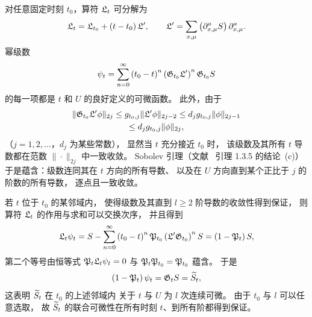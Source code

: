 对任意固定时刻 $t_0$，算符 $\mathfrak{L}_t$ 可分解为
\begin{equation}
  \mathfrak{L}_t=\mathfrak{L}_{t_0}+\left(t-t_0\right)\mathfrak{L}',
  \qquad
  \mathfrak{L}'=\sum_{x,\mu}
  \left(\partial^a_{x,\mu}S\right)\partial^a_{x,\mu}.
\end{equation}
幂级数
\begin{equation}
  \psi_t=\sum_{n=0}^{\infty}\left(t_0-t\right)^n
  \left(\mathfrak{G}_{t_0}\mathfrak{L}'\right)^n\mathfrak{G}_{t_0} S
\end{equation}
的每一项都是 $t$ 和 $U$ 的良好定义的可微函数。
此外，由于
\begin{multline}
  \|\mathfrak{G}_{t_0}\mathfrak{L}'\phi\|_{2j}\leq g_{t_0,j}\|\mathfrak{L}'\phi\|_{2j-2}\leq
  d_jg_{t_0,j}\|\phi\|_{2j-1}\\
  \leq d_jg_{t_0,j}\|\phi\|_{2j},
\end{multline}
（$j=1,2,\ldots$，$d_j$ 为某些常数），
显然当 $t$ 充分接近 $t_0$ 时，
该级数及其所有 $t$ 导数都在范数 $\|\cdot\|_{2j}$ 中一致收敛。
Sobolev 引理（文献~\cite{Gilkey} 引理 1.3.5 的结论~(c)）
于是蕴含：级数连同其在 $t$ 方向的所有导数、
以及在 $U$ 方向直到某个正比于 $j$ 的阶数的所有导数，
逐点且一致收敛。

若 $t$ 位于 $t_0$ 的某邻域内，
使得级数及其直到 $l\geq2$ 阶导数的收敛性得到保证，
则算符 $\mathfrak{L}_t$ 的作用与求和可以交换次序，
并且得到
\begin{equation}
  \mathfrak{L}_t\psi_t=S-\sum_{n=0}^{\infty}\left(t_0-t\right)^n
  \mathfrak{P}_{t_0}\left(\mathfrak{L}'\mathfrak{G}_{t_0}\right)^nS
  =\left(1-\mathfrak{P}_t\right)S,
\end{equation}
第二个等号由恒等式 $\mathfrak{P}_t\mathfrak{L}_t\psi_t=0$ 与 $\mathfrak{P}_t\mathfrak{P}_{t_0}=\mathfrak{P}_{t_0}$ 蕴含。
于是
\begin{equation}
  \left(1-\mathfrak{P}_t\right)\psi_t=\mathfrak{G}_t S=\widetilde{S}_t,
\end{equation}
这表明 $\widetilde{S}_t$ 在 $t_0$ 的上述邻域内
关于 $t$ 与 $U$ 为 $l$ 次连续可微。
由于 $t_0$ 与 $l$ 可以任意选取，
故 $\widetilde{S}_t$ 的联合可微性在所有时刻 $t$、到所有阶都得到保证。

